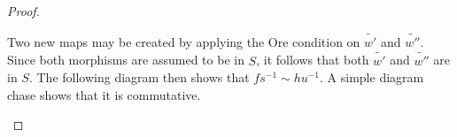 \begin{proof}
\begin{itemize}
            \begin{center}
            \end{center}
            Two new maps may be created by applying the Ore condition on $\widetilde{w'}$ and $\widetilde{w''}$. Since both morphisms are assumed to be in $S$, it follows that both $\widetilde{w'}$ and $\widetilde{w''}$ are in $S$. The following diagram then shows that $fs^{-1}\sim hu^{-1}$. A simple diagram chase shows that it is commutative.
            \begin{center}
            \end{center}
        \end{itemize}
    \end{proof}

